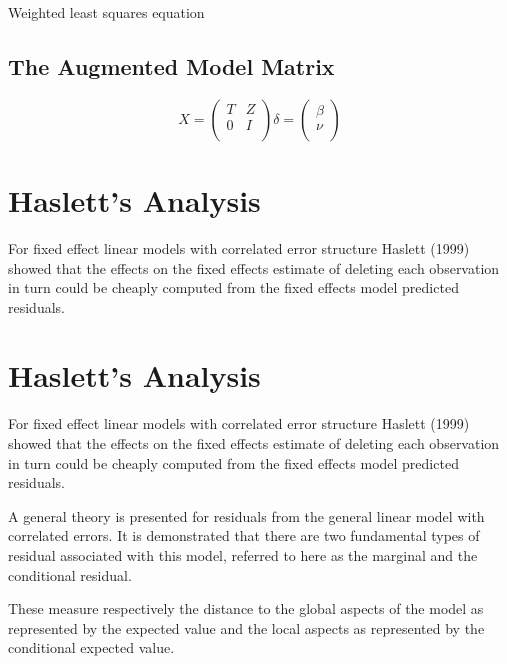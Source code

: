 \documentclass[Main.tex]{subfiles}
\begin{document}
Weighted least squares equation



\subsection{The Augmented Model Matrix}  %
\begin{equation}
X = \left(%
\begin{array}{cc}
T & Z \\
0 & I \\
\end{array}%
\right)
\delta = \left(%
\begin{array}{c}
\beta  \\
\nu  \\
\end{array}%
\right)
\end{equation}





\section{Haslett's Analysis} %
For fixed effect linear models with correlated error structure Haslett (1999) showed that the effects on
the fixed effects estimate of deleting each observation in turn could be cheaply computed from the fixed effects model predicted residuals.



\newpage

\section{Haslett's Analysis} %
For fixed effect linear models with correlated error structure Haslett (1999) showed that the effects on
the fixed effects estimate of deleting each observation in turn could be cheaply computed from the fixed effects model predicted residuals.



A general theory is presented for residuals from the general linear model with correlated errors.
It is demonstrated that there are two fundamental types of residual associated with this model,
referred to here as the marginal and the conditional residual.


These measure respectively the distance to the global aspects of the model as represented by the expected value
and the local aspects as represented by the conditional expected value.
\end{document}
